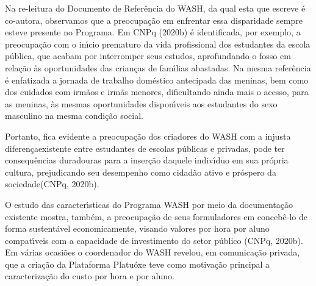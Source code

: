\documentclass[
12pt,		%
openright,	%
twoside,  %
a4paper,			%
chapter=TITLE,		%
english,			%
french,				%
spanish,			%
brazil				%
]{USPSC-classe/USPSC}
\begin{document}
Na re-leitura do Documento de Refer\^encia do WASH, da qual esta que escreve \'e co-autora, observamos que a preocupa\c{c}\~ao em enfrentar essa disparidade sempre esteve presente no Programa. Em  CNPq (2020b) \'e identificada, por exemplo, a preocupa\c{c}\~ao com o in\'{\i}cio prematuro da vida profissional dos estudantes da escola p\'ublica, que acabam por interromper seus estudos, aprofundando o fosso em rela\c{c}\~ao \`as oportunidades das crian\c{c}as de fam\'{\i}lias abastadas. Na mesma refer\^encia \'e enfatizada a jornada de trabalho dom\'estico antecipada  das meninas, bem como dos cuidados com irm\~aos e irm\~as menores, dificultando ainda mais o acesso, para as meninas, \`as mesmas oportunidades dispon\'{\i}veis aos estudantes do sexo masculino na mesma condi\c{c}\~ao social.










Portanto, fica evidente a preocupa\c{c}\~ao dos criadores do WASH com a \textquotedbl injusta diferen\c{c}a\textquotedbl  existente entre estudantes de escolas p\'ublicas e privadas, \textquotedbl pode ter consequ\^encias duradouras para a inser\c{c}\~ao daquele indiv\'{\i}duo em sua pr\'opria cultura, prejudicando seu desempenho como cidad\~ao ativo e pr\'ospero da sociedade\textquotedbl   (CNPq, 2020b).











\noindent\begin{center}\mbox{\centering{}}\end{center}


O estudo das caracter\'{\i}sticas do Programa WASH por meio da documenta\c{c}\~ao existente mostra, tamb\'em, a preocupa\c{c}\~ao de seus formuladores em conceb\^e-lo de forma sustent\'avel economicamente, visando valores por hora por aluno compat\'{\i}veis com a capacidade de investimento do setor p\'ublico  (CNPq, 2020b). Em v\'arias ocasi\~oes o coordenador do WASH revelou, em comunica\c{c}\~ao privada, que a cria\c{c}\~ao da Plataforma Platu\'oxe teve como motiva\c{c}\~ao principal a caracteriza\c{c}\~ao do custo por hora e por aluno.
\end{document}
